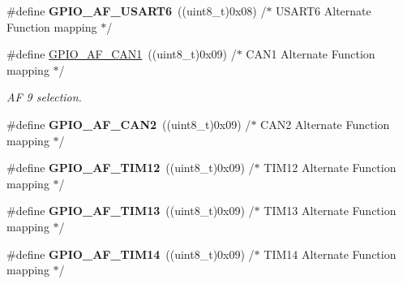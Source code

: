 \begin{DoxyCompactItemize}
\#define {\bfseries G\+P\+I\+O\+\_\+\+A\+F\+\_\+\+U\+S\+A\+R\+T6}~((uint8\+\_\+t)0x08)  /$\ast$ U\+S\+A\+R\+T6 Alternate Function mapping $\ast$/
\item 
\mbox{\label{group___g_p_i_o___alternat__function__selection__define_gaf5defeedc302bf348e31dd7bdcdd882f}} 
\#define \hyperlink{group___g_p_i_o___alternat__function__selection__define_gaf5defeedc302bf348e31dd7bdcdd882f}{G\+P\+I\+O\+\_\+\+A\+F\+\_\+\+C\+A\+N1}~((uint8\+\_\+t)0x09)  /$\ast$ C\+A\+N1 Alternate Function mapping $\ast$/
\begin{DoxyCompactList}\small\item\em AF 9 selection. \end{DoxyCompactList}\item 
\mbox{\label{group___g_p_i_o___alternat__function__selection__define_ga4896d720d93f50f17207b4059ab5ebfb}} 
\#define {\bfseries G\+P\+I\+O\+\_\+\+A\+F\+\_\+\+C\+A\+N2}~((uint8\+\_\+t)0x09)  /$\ast$ C\+A\+N2 Alternate Function mapping $\ast$/
\item 
\mbox{\label{group___g_p_i_o___alternat__function__selection__define_ga681ff7964f5d73ed973a299383b13c90}} 
\#define {\bfseries G\+P\+I\+O\+\_\+\+A\+F\+\_\+\+T\+I\+M12}~((uint8\+\_\+t)0x09)  /$\ast$ T\+I\+M12 Alternate Function mapping $\ast$/
\item 
\mbox{\label{group___g_p_i_o___alternat__function__selection__define_gae89e027f14289052d5c51b4c96f79702}} 
\#define {\bfseries G\+P\+I\+O\+\_\+\+A\+F\+\_\+\+T\+I\+M13}~((uint8\+\_\+t)0x09)  /$\ast$ T\+I\+M13 Alternate Function mapping $\ast$/
\item 
\mbox{\label{group___g_p_i_o___alternat__function__selection__define_ga9341da4e7ba3921ed1a683df3ec0e41b}} 
\#define {\bfseries G\+P\+I\+O\+\_\+\+A\+F\+\_\+\+T\+I\+M14}~((uint8\+\_\+t)0x09)  /$\ast$ T\+I\+M14 Alternate Function mapping $\ast$/
\item 
\mbox{\label{group___g_p_i_o___alternat__function__selection__define_gaeba0aeefec841e505170efc7762ae588}} 

\end{DoxyCompactItemize}
